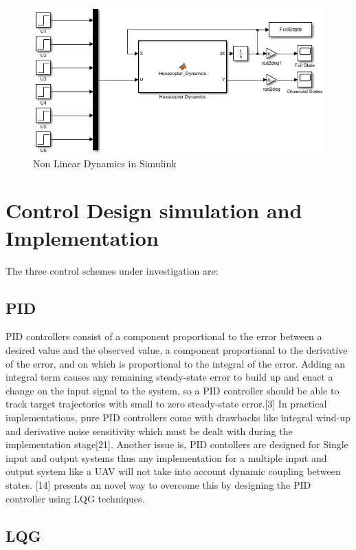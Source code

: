 \documentclass[12pt,a4paper,twoside]{report}
\begin{document}
				\begin{figure}[h!]
					\centering
					\includegraphics[width=0.8\linewidth]{sim.png}
					\caption{Non Linear Dynamics in Simulink}
					\label{fig:Sim}
				\end{figure} 
				 
				
		\section*{Control Design simulation and Implementation}
			
			The three control schemes under investigation are: 

			\subsection*{PID}
			
				PID controllers consist of a component proportional to the error between a desired value and the observed value, a component proportional to the derivative of the error, and on which is proportional to the integral of the error. Adding an integral term causes any remaining steady-state error to build up and enact a change on the input signal to the system, so a PID controller should be able to track target trajectories with small to zero steady-state error.[3] In practical implementations, pure PID controllers come with drawbacks like integral wind-up and derivative noise sensitivity which  must be dealt with during the implementation stage[21]. Another issue is, PID contollers are designed for Single input and output systems thus any implementation for a multiple input and output system like a UAV will not take into account dynamic coupling between states. [14] presents an novel way to overcome this by designing the PID controller using LQG techniques.
				
			\subsection*{LQG}
			
\end{document}
